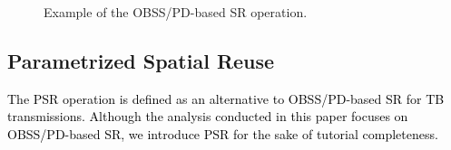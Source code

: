 \documentclass[preprint,12pt]{elsarticle}
\theoremstyle{plain}
\begin{document}
\begin{figure}[ht!]
	\centering
	\hspace{1cm}
	\caption{Example of the OBSS/PD-based SR operation.}
	\label{fig:fig_10}
\end{figure}


\subsection{Parametrized Spatial Reuse}
\label{section:srp_based}	
\textcolor{black}{The PSR operation is defined as an alternative to OBSS/PD-based SR for TB transmissions. Although the analysis conducted in this paper focuses on OBSS/PD-based SR, we introduce PSR for the sake of tutorial completeness.}
\end{document}
